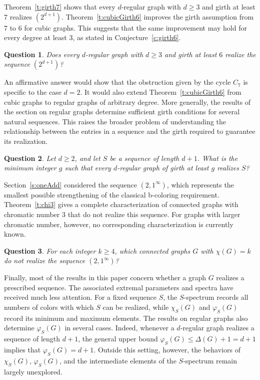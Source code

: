 \documentclass{article}
\newtheorem{question}{Question}
\theoremstyle{definition}
\begin{document}
Theorem~\ref{t:girth7} shows that every $d$-regular graph with $d\ge 3$ and girth at least $7$ realizes $(2^{d+1})$. Theorem~\ref{t:cubicGirth6} improves the girth assumption from $7$ to $6$ for cubic graphs. This suggests that the same improvement may hold for every degree at least $3$, as stated in Conjecture~\ref{c:girth6}.

\begin{question}
Does every $d$-regular graph with $d\ge 3$ and girth at least $6$ realize the sequence $(2^{d+1})$?
\end{question}

An affirmative answer would show that the obstruction given by the cycle $C_7$ is specific to the case $d=2$. It would also extend Theorem~\ref{t:cubicGirth6} from cubic graphs to regular graphs of arbitrary degree. More generally, the results of the section on regular graphs determine sufficient girth conditions for several natural sequences. This raises the broader problem of understanding the relationship between the entries in a sequence and the girth required to guarantee its realization.

\begin{question}
Let $d\ge 2$, and let $S$ be a sequence of length $d+1$. What is the minimum integer $g$ such that every $d$-regular graph of girth at least $g$ realizes $S$?
\end{question}

Section~\ref{s:oneAdd} considered the sequence $(2,1^\infty)$, which represents the smallest possible strengthening of the classical b-coloring requirement. Theorem~\ref{t:chi3} gives a complete characterization of connected graphs with chromatic number $3$ that do not realize this sequence. For graphs with larger chromatic number, however, no corresponding characterization is currently known.

\begin{question}
For each integer $k\geq4$, which connected graphs $G$ with $\chi(G)=k$ do not realize the sequence $(2,1^\infty)$?
\end{question}

Finally, most of the results in this paper concern whether a graph $G$ realizes a prescribed sequence. The associated extremal parameters and spectra have received much less attention. For a fixed sequence $S$, the $S$-spectrum records all numbers of colors with which $S$ can be realized, while $\chi_S(G)$ and $\varphi_S(G)$ record its minimum and maximum elements. The results on regular graphs also determine $\varphi_S(G)$ in several cases. Indeed, whenever a $d$-regular graph realizes a sequence of length $d+1$, the general upper bound $\varphi_S(G)\leq\Delta(G)+1=d+1$ implies that $\varphi_S(G)=d+1$. Outside this setting, however, the behaviors of $\chi_S(G)$, $\varphi_S(G)$, and the intermediate elements of the $S$-spectrum remain largely unexplored.
\end{document}
